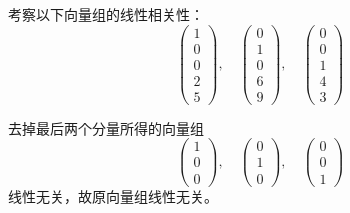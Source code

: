 \begin{li}
  考察以下向量组的线性相关性：
  $$
  \left(
  \begin{array}{c}
    1\\
    0\\
    0\\
    2\\
    5
  \end{array}
  \right), \quad
  \left(
  \begin{array}{c}
    0\\
    1\\
    0\\
    6\\
    9
  \end{array}
  \right), \quad
  \left(
  \begin{array}{c}
    0\\
    0\\
    1\\
    4\\
    3
  \end{array}
  \right)
  $$
\end{li}
\begin{jie}
去掉最后两个分量所得的向量组
$$
\left(
\begin{array}{c}
  1\\
  0\\
  0
\end{array}
\right), \quad
\left(
\begin{array}{c}
  0\\
  1\\
  0
\end{array}
\right), \quad
\left(
\begin{array}{c}
  0\\
  0\\
  1
\end{array}
\right)
$$
线性无关，故原向量组线性无关。
\end{jie}


